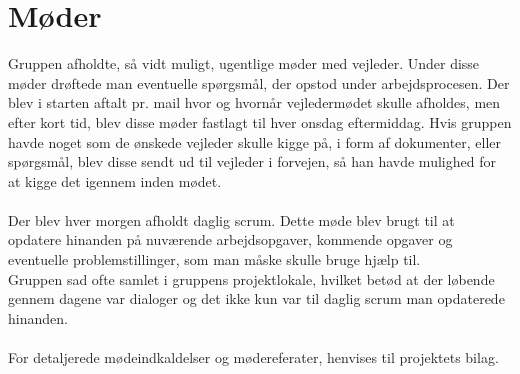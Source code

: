 \section{Møder}
Gruppen afholdte, så vidt muligt, ugentlige møder med vejleder. Under disse møder drøftede man eventuelle spørgsmål, der opstod under arbejdsprocesen.
Der blev i starten aftalt pr. mail hvor og hvornår vejledermødet skulle afholdes, men efter kort tid, blev disse møder fastlagt til hver onsdag eftermiddag.
Hvis gruppen havde noget som de ønskede vejleder skulle kigge på, i form af dokumenter, eller spørgsmål, blev disse sendt ud til vejleder i forvejen, så han havde mulighed for at kigge det igennem inden mødet. \\ \\
Der blev hver morgen afholdt daglig scrum. Dette møde blev brugt til at opdatere hinanden på nuværende arbejdsopgaver, kommende opgaver og eventuelle problemstillinger, som man måske skulle bruge hjælp til. \\
Gruppen sad ofte samlet i gruppens projektlokale, hvilket betød at der løbende gennem dagene var dialoger og det ikke kun var til daglig scrum man opdaterede hinanden. \\ \\
For detaljerede mødeindkaldelser og mødereferater, henvises til projektets bilag.

